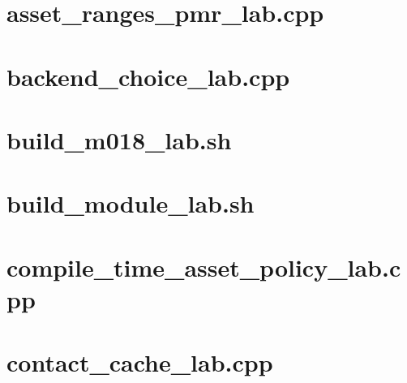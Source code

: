 \documentclass[11pt,twoside,openany]{book}
\begin{document}
\section*{asset\_ranges\_pmr\_lab.cpp}
\hypertarget{source-file-9e5ff4ba88e6efabc938832a}{}
\label{attachmentstart:source-file-9e5ff4ba88e6efabc938832a}
\section*{backend\_choice\_lab.cpp}
\hypertarget{source-file-c936569afa19be638ec87991}{}
\label{attachmentstart:source-file-c936569afa19be638ec87991}
\section*{build\_m018\_lab.sh}
\hypertarget{source-file-e1b7c3e4f52da0e7c9c36a41}{}
\label{attachmentstart:source-file-e1b7c3e4f52da0e7c9c36a41}
\section*{build\_module\_lab.sh}
\hypertarget{source-file-f5eb017280bb6b2ae6b1475d}{}
\label{attachmentstart:source-file-f5eb017280bb6b2ae6b1475d}
\section*{compile\_time\_asset\_policy\_lab.cpp}
\hypertarget{source-file-830b13449e1c6505af693753}{}
\label{attachmentstart:source-file-830b13449e1c6505af693753}
\section*{contact\_cache\_lab.cpp}
\hypertarget{source-file-887bbb1db2a031cbbf1eee43}{}
\label{attachmentstart:source-file-887bbb1db2a031cbbf1eee43}
\end{document}
